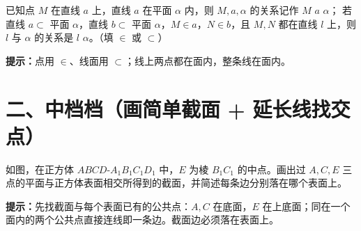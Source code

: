 \documentclass{exam-zh}
\begin{document}
\begin{question}[points=6]
  已知点 $M$ 在直线 $a$ 上，直线 $a$ 在平面 $\alpha$ 内，则 $M,a,\alpha$ 的关系记作 $M$ \underline{\quad} $a$ \underline{\quad} $\alpha$；
若直线 $a\subset$ 平面 $\alpha$，直线 $b\subset$ 平面 $\alpha$，$M\in a$，$N\in b$，且 $M,N$ 都在直线 $l$ 上，则 $l$ 与 $\alpha$ 的关系是 $l$ \underline{\quad} $\alpha$。（填 $\in$ 或 $\subset$）
  \begin{hintbox}
\textbf{提示：}点用 $\in$、线面用 $\subset$；线上两点都在面内，整条线在面内。\end{hintbox}

\end{question}


\section*{二、中档档（画简单截面 + 延长线找交点）}


\begin{problem}[points=9]
  \noindent
  \begin{minipage}[t]{\dimexpr\linewidth-60mm-6mm\relax}
    \vspace{0pt}
    如图，在正方体 $ABCD\text{-}A_1B_1C_1D_1$ 中，$E$ 为棱 $B_1C_1$ 的中点。画出过 $A,C,E$ 三点的平面与正方体表面相交所得到的截面，并简述每条边分别落在哪个表面上。

    \begin{hintbox}
\textbf{提示：}先找截面与每个表面已有的公共点：$A,C$ 在底面，$E$ 在上底面；同在一个面内的两个公共点直接连线即一条边。截面边必须落在表面上。\end{hintbox}

  \end{minipage}\hfill
  \begin{diagramcoltikz}{60mm}{正方体，E 为 B1C1 中点，过 A、C、E 画截面。}
  }
  \end{diagramcoltikz}
  \par\medskip
  \answerarea[52mm]
\end{problem}


\end{document}
